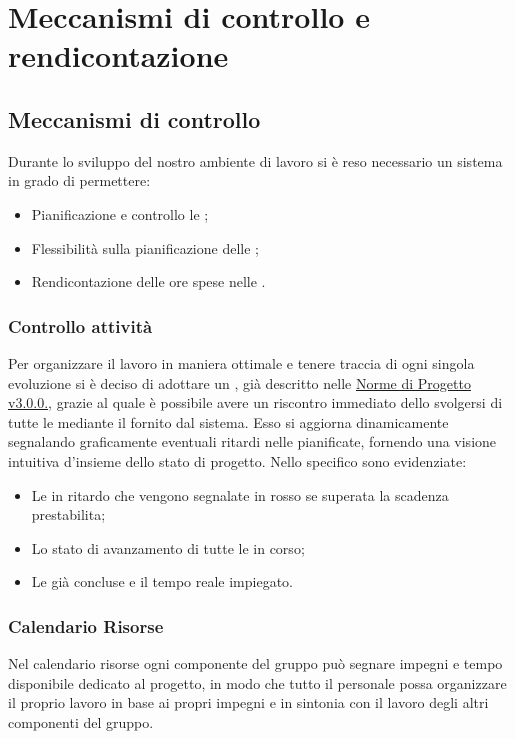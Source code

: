 \documentclass{scalatekids-article}
\begin{document}
\section{Meccanismi di controllo e rendicontazione}
\subsection{Meccanismi di controllo}
Durante lo sviluppo del nostro ambiente di lavoro si è reso necessario un sistema in grado di permettere:
\begin{itemize}
\item{Pianificazione e controllo le ;}
\item{Flessibilità sulla pianificazione delle ;}
\item{Rendicontazione delle ore spese nelle .}
\end{itemize}
\subsubsection{Controllo attività}
Per organizzare il lavoro in maniera ottimale e tenere traccia di ogni singola evoluzione si è deciso di adottare un , già descritto nelle \href{run:../Interni/NormeDiProgetto\_v3.0.0.pdf}{Norme di Progetto v3.0.0.}, grazie al quale è
possibile avere un riscontro immediato dello svolgersi di tutte le  mediante il  fornito dal sistema. Esso si aggiorna dinamicamente segnalando graficamente eventuali ritardi nelle  pianificate, fornendo una visione intuitiva d'insieme dello stato di progetto.
Nello specifico sono evidenziate:
\begin{itemize}
\item{Le  in ritardo che vengono segnalate in rosso se superata la scadenza prestabilita;}
\item{Lo stato di avanzamento di tutte le  in corso;}
\item{Le  già concluse e il tempo reale impiegato.}
\end{itemize}
\subsubsection{Calendario Risorse}
Nel calendario risorse ogni componente del gruppo può segnare impegni e tempo disponibile dedicato
al progetto, in modo che tutto il personale possa organizzare il proprio lavoro in base ai propri
impegni e in sintonia con il lavoro degli altri componenti del gruppo.
\end{document}
